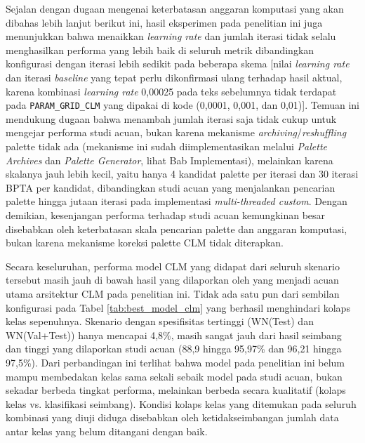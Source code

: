 Sejalan dengan dugaan mengenai keterbatasan anggaran komputasi yang akan dibahas lebih lanjut berikut ini, hasil eksperimen pada penelitian ini juga menunjukkan bahwa menaikkan \textit{learning rate} dan jumlah iterasi tidak selalu menghasilkan performa yang lebih baik di seluruh metrik dibandingkan konfigurasi dengan iterasi lebih sedikit pada beberapa skema [nilai \textit{learning rate} dan iterasi \textit{baseline} yang tepat perlu dikonfirmasi ulang terhadap hasil aktual, karena kombinasi \textit{learning rate} 0,00025 pada teks sebelumnya tidak terdapat pada \texttt{PARAM\_GRID\_CLM} yang dipakai di kode (0,0001, 0,001, dan 0,01)]. Temuan ini mendukung dugaan bahwa menambah jumlah iterasi saja tidak cukup untuk mengejar performa studi acuan, bukan karena mekanisme \textit{archiving}/\textit{reshuffling} palette tidak ada (mekanisme ini sudah diimplementasikan melalui \textit{Palette Archives} dan \textit{Palette Generator}, lihat Bab Implementasi), melainkan karena skalanya jauh lebih kecil, yaitu hanya 4 kandidat palette per iterasi dan 30 iterasi BPTA per kandidat, dibandingkan studi acuan yang menjalankan pencarian palette hingga jutaan iterasi pada implementasi \textit{multi-threaded custom}. Dengan demikian, kesenjangan performa terhadap studi acuan kemungkinan besar disebabkan oleh keterbatasan skala pencarian palette dan anggaran komputasi, bukan karena mekanisme koreksi palette CLM tidak diterapkan.

Secara keseluruhan, performa model CLM yang didapat dari seluruh skenario tersebut masih jauh di bawah hasil yang dilaporkan oleh \textcite{wozniak2021deep} yang menjadi acuan utama arsitektur CLM pada penelitian ini. Tidak ada satu pun dari sembilan konfigurasi pada Tabel \ref{tab:best_model_clm} yang berhasil menghindari kolaps kelas sepenuhnya. Skenario dengan spesifisitas tertinggi (WN(Test) dan WN(Val+Test)) hanya mencapai 4,8\%, masih sangat jauh dari hasil seimbang dan tinggi yang dilaporkan studi acuan (88,9 hingga 95,97\% dan 96,21 hingga 97,5\%). Dari perbandingan ini terlihat bahwa model pada penelitian ini belum mampu membedakan kelas sama sekali sebaik model pada studi acuan, bukan sekadar berbeda tingkat performa, melainkan berbeda secara kualitatif (kolaps kelas vs. klasifikasi seimbang). Kondisi kolaps kelas yang ditemukan pada seluruh kombinasi yang diuji diduga disebabkan oleh ketidakseimbangan jumlah data antar kelas yang belum ditangani dengan baik.

